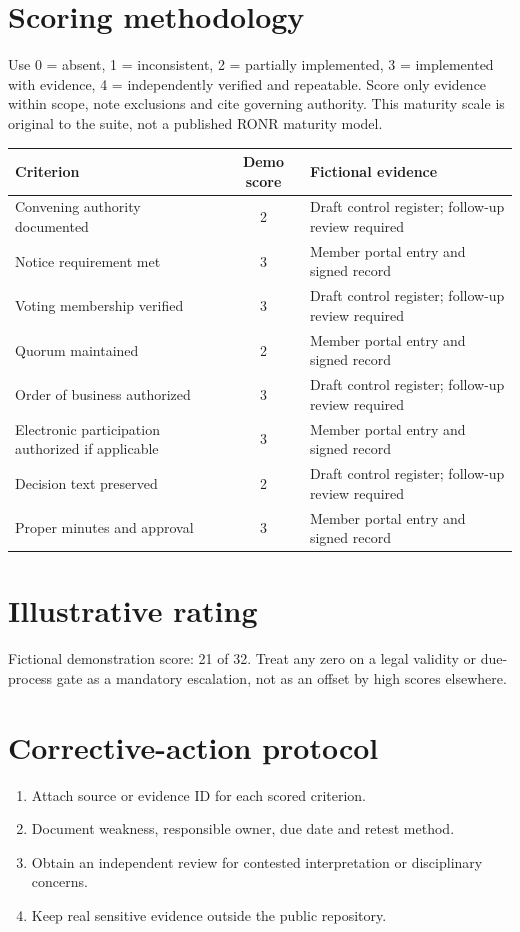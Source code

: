 \documentclass[11pt]{article}
\begin{document}
\SuiteOpen
\section{Scoring methodology}
Use 0 = absent, 1 = inconsistent, 2 = partially implemented, 3 = implemented with evidence, 4 = independently verified and repeatable. Score only evidence within scope, note exclusions and cite governing authority. This maturity scale is original to the suite, not a published RONR maturity model.

\small\begin{longtable}{@{}p{.44\linewidth}cp{.39\linewidth}@{}}\toprule Criterion & Demo score & Fictional evidence\\\midrule\endhead

Convening authority documented & 2 & Draft control register; follow-up review required\\
Notice requirement met & 3 & Member portal entry and signed record\\
Voting membership verified & 3 & Draft control register; follow-up review required\\
Quorum maintained & 2 & Member portal entry and signed record\\
Order of business authorized & 3 & Draft control register; follow-up review required\\
Electronic participation authorized if applicable & 3 & Member portal entry and signed record\\
Decision text preserved & 2 & Draft control register; follow-up review required\\
Proper minutes and approval & 3 & Member portal entry and signed record\\
\bottomrule\end{longtable}\normalsize
\section{Illustrative rating}
Fictional demonstration score: 21 of 32. Treat any zero on a legal validity or due-process gate as a mandatory escalation, not as an offset by high scores elsewhere.

\section{Corrective-action protocol}
\begin{enumerate}[leftmargin=*,itemsep=4pt]
\item Attach source or evidence ID for each scored criterion.
\item Document weakness, responsible owner, due date and retest method.
\item Obtain an independent review for contested interpretation or disciplinary concerns.
\item Keep real sensitive evidence outside the public repository.
\end{enumerate}
\end{document}
